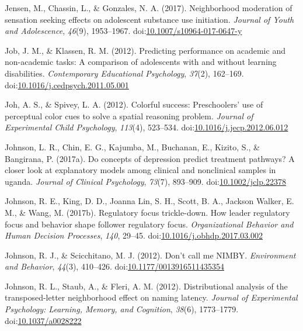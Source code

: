 \documentclass[english,man]{apa6}
\begin{document}
\hypertarget{ref-Jensen2017}{}
Jensen, M., Chassin, L., \& Gonzales, N. A. (2017). Neighborhood
moderation of sensation seeking effects on adolescent substance use
initiation. \emph{Journal of Youth and Adolescence}, \emph{46}(9),
1953--1967.
doi:\href{https://doi.org/10.1007/s10964-017-0647-y}{10.1007/s10964-017-0647-y}

\hypertarget{ref-Job2012}{}
Job, J. M., \& Klassen, R. M. (2012). Predicting performance on academic
and non-academic tasks: A comparison of adolescents with and without
learning disabilities. \emph{Contemporary Educational Psychology},
\emph{37}(2), 162--169.
doi:\href{https://doi.org/10.1016/j.cedpsych.2011.05.001}{10.1016/j.cedpsych.2011.05.001}

\hypertarget{ref-Joh2012}{}
Joh, A. S., \& Spivey, L. A. (2012). Colorful success: Preschoolers' use
of perceptual color cues to solve a spatial reasoning problem.
\emph{Journal of Experimental Child Psychology}, \emph{113}(4),
523--534.
doi:\href{https://doi.org/10.1016/j.jecp.2012.06.012}{10.1016/j.jecp.2012.06.012}

\hypertarget{ref-Johnson2017}{}
Johnson, L. R., Chin, E. G., Kajumba, M., Buchanan, E., Kizito, S., \&
Bangirana, P. (2017a). Do concepts of depression predict treatment
pathways? A closer look at explanatory models among clinical and
nonclinical samples in uganda. \emph{Journal of Clinical Psychology},
\emph{73}(7), 893--909.
doi:\href{https://doi.org/10.1002/jclp.22378}{10.1002/jclp.22378}

\hypertarget{ref-Johnson2017a}{}
Johnson, R. E., King, D. D., Joanna Lin, S. H., Scott, B. A., Jackson
Walker, E. M., \& Wang, M. (2017b). Regulatory focus trickle-down. How
leader regulatory focus and behavior shape follower regulatory focus.
\emph{Organizational Behavior and Human Decision Processes}, \emph{140},
29--45.
doi:\href{https://doi.org/10.1016/j.obhdp.2017.03.002}{10.1016/j.obhdp.2017.03.002}

\hypertarget{ref-Johnson2012}{}
Johnson, R. J., \& Scicchitano, M. J. (2012). Don't call me NIMBY.
\emph{Environment and Behavior}, \emph{44}(3), 410--426.
doi:\href{https://doi.org/10.1177/0013916511435354}{10.1177/0013916511435354}

\hypertarget{ref-Johnson2012a}{}
Johnson, R. L., Staub, A., \& Fleri, A. M. (2012). Distributional
analysis of the transposed-letter neighborhood effect on naming latency.
\emph{Journal of Experimental Psychology: Learning, Memory, and
Cognition}, \emph{38}(6), 1773--1779.
doi:\href{https://doi.org/10.1037/a0028222}{10.1037/a0028222}
\end{document}
